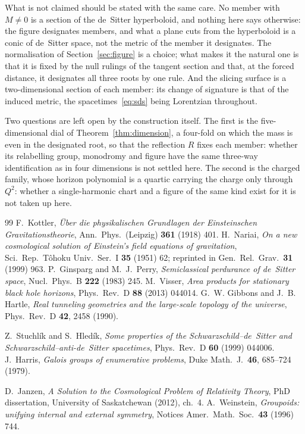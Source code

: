 \documentclass[11pt]{article}
\theoremstyle{plain}
\theoremstyle{definition}
\theoremstyle{remark}
\begin{document}
What is not claimed should be stated with the same care. No member with $M\neq0$ is a section of the
de~Sitter hyperboloid, and nothing here says otherwise: the figure designates members, and what a plane cuts from
the hyperboloid is a conic of de~Sitter space, not the metric of the member it designates. The normalisation of
Section~\ref{sec:figure} is a choice; what makes it the natural one is that it is fixed by the null rulings of
the tangent section and that, at the forced distance, it designates all three roots by one rule. And the slicing
surface is a two-dimensional section of each member: its change of signature is that of the induced metric,
the spacetimes~\eqref{eq:sds} being Lorentzian throughout.

Two questions are left open by the construction itself. The first is the five-dimensional dial of
Theorem~\ref{thm:dimension}, a four-fold on which the mass is even in the designated root, so that the reflection
$R$ fixes each member: whether its relabelling group, monodromy and figure have the same three-way identification
as in four dimensions is not settled here. The second is the charged family, whose horizon polynomial is a
quartic carrying the charge only through $Q^{2}$: whether a single-harmonic chart and a figure of the same kind
exist for it is not taken up here.


\begin{thebibliography}{99}
 F.~Kottler, \emph{\"Uber die physikalischen Grundlagen der Einsteinschen
Gravitationstheorie}, Ann.\ Phys.\ (Leipzig) \textbf{361} (1918) 401.
 H.~Nariai, \emph{On a new cosmological solution of Einstein's field equations of
gravitation}, Sci.\ Rep.\ T\^ohoku Univ.\ Ser.\ I \textbf{35} (1951) 62; reprinted in Gen.\ Rel.\ Grav.\
\textbf{31} (1999) 963.
 P.~Ginsparg and M.~J.~Perry, \emph{Semiclassical perdurance of de~Sitter space},
Nucl.\ Phys.\ B \textbf{222} (1983) 245.
 M.~Visser, \emph{Area products for stationary black hole horizons}, Phys.\ Rev.\ D
\textbf{88} (2013) 044014.
 G.~W. Gibbons and J.~B. Hartle, \emph{Real tunneling geometries and the large-scale topology of the universe}, Phys.\ Rev.\ D \textbf{42}, 2458 (1990).

 Z.~Stuchl\'ik and S.~Hled\'ik, \emph{Some properties of the
Schwarzschild--de~Sitter and Schwarzschild--anti-de~Sitter spacetimes}, Phys.\ Rev.\ D \textbf{60} (1999)
044006.
 J.~Harris, \emph{Galois groups of enumerative problems}, Duke Math.\ J.\ \textbf{46}, 685--724 (1979).

 D.~Janzen, \emph{A Solution to the Cosmological Problem of Relativity Theory}, PhD
dissertation, University of Saskatchewan (2012), ch.~4.
 A.~Weinstein, \emph{Groupoids: unifying internal and external symmetry}, Notices
Amer.\ Math.\ Soc.\ \textbf{43} (1996) 744.
\end{thebibliography}
\end{document}
